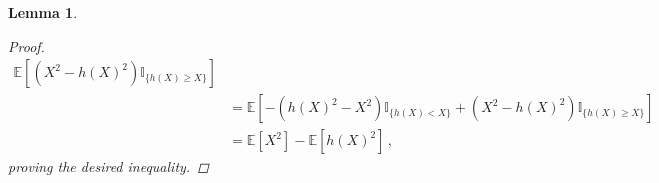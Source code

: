 \documentclass[letter, 12pt]{report}
\newcommand{\E}{\mathbb E}
\newcommand{\1}{\mathbf{1}}
\newcommand{\mI}{\mathbb{I}}
\theoremstyle{plain}
\newtheorem{lemma}[theorem]{Lemma}
\theoremstyle{definition}
\theoremstyle{remark}
\begin{document}
\begin{lemma}
\begin{proof}
\begin{align*}
            \E\left[
                \left(
                X^2 - h(X)^2
                \right)
                \mI_{\{h(X) \geq X\}}
                \right]
            \\
              &
            =\E\left[
                -
                \left(
                h(X)^2 - X^2
                \right)
                \mI_{\{h(X) < X\}}
                +
                \left(
                X^2 - h(X)^2
                \right)
                \mI_{\{h(X) \geq X\}}
                \right]
            \\
              & =
            \E[X^2] - \E[h(X)^2]\,,
        \end{align*}
        proving the desired inequality.
    \end{proof}
\end{lemma}
\end{document}
